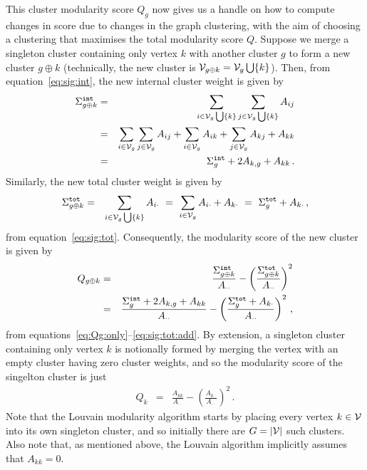 \documentclass[a4paper]{article}
\begin{document}
This cluster modularity score $Q_g$ now gives us a handle on how to compute changes in score
due to changes in the graph clustering, with the aim of choosing a clustering that maximises
the total modularity score $Q$.
Suppose we merge a singleton cluster containing only vertex $k$ with another cluster $g$ to form a new
cluster $g\oplus k$ (technically, the new cluster is ${\cal V}_{g\oplus k}={\cal V}_g\bigcup\{k\}$). 
Then, from equation~\eqref{eq:sig:int}, the new internal cluster weight is
given by
\begin{eqnarray}
   \Sigma_{g\oplus k}^{\tt int} & = & \sum_{i\in{\cal V}_g\bigcup\{k\}}
   \sum_{j\in{\cal V}_g\bigcup\{k\}} A_{ij}
\nonumber\\&=&
    \sum_{i\in{\cal V}_g}\sum_{j\in{\cal V}_g} A_{ij}
    +\sum_{i\in{\cal V}_g}A_{ik}+\sum_{j\in{\cal V}_g}A_{kj}+A_{kk}
\nonumber\\&=&
    \Sigma_g^{\tt int}+2A_{k,g}+A_{kk}\,.
\label{eq:sig:int:add}
\end{eqnarray}
Similarly, the new total cluster weight is given by
\begin{eqnarray}
    \Sigma_{g\oplus k}^{\tt tot} & = & \sum_{i\in{\cal V}_g\bigcup\{k\}} A_{i\cdot}
~=~
    \sum_{i\in{\cal V}_g} A_{i\cdot}+A_{k\cdot}
    ~=~\Sigma_{g}^{\tt tot}+A_{k\cdot}\,,
\label{eq:sig:tot:add}
\end{eqnarray}
from equation~\eqref{eq:sig:tot}.
Consequently, the modularity score of the new cluster is given by
\begin{eqnarray}
Q_{g\oplus k} & = & 
\frac{\Sigma_{g\oplus k}^{\tt int}}{A_{\cdot\cdot}}
    -\left(\frac{\Sigma_{g\oplus k}^{\tt tot}}{A_{\cdot\cdot}}\right)^2
\nonumber\\& = &
\frac{\Sigma_{g}^{\tt int}+2A_{k,g}+A_{kk}}{A_{\cdot\cdot}}
    -\left(\frac{\Sigma_{g}^{\tt tot}+A_{k\cdot}}{A_{\cdot\cdot}}\right)^2\,,
\label{eq:Qgpk}
\end{eqnarray}
from equations~\eqref{eq:Qg:only}--\eqref{eq:sig:tot:add}.
By extension, a singleton cluster containing only vertex $k$ is notionally
formed by merging the vertex with an empty cluster having zero cluster weights, and so the
modularity score of the singelton cluster is just
\begin{eqnarray}
    Q_k & = & \frac{A_{kk}}{A_{\cdot\cdot}}
    -\left(\frac{A_{k\cdot}}{A_{\cdot\cdot}}\right)^2\,.
\label{eq:Qk}
\end{eqnarray}
Note that the Louvain modularity algorithm \cite{blondel08} starts by placing every vertex $k\in{\cal V}$ into
its own singleton cluster, and so initially there are $G=|{\cal V}|$ such clusters.
Also note that, as mentioned above, the Louvain algorithm \cite{blondel08} implicitly assumes that $A_{kk}=0$.
\end{document}
